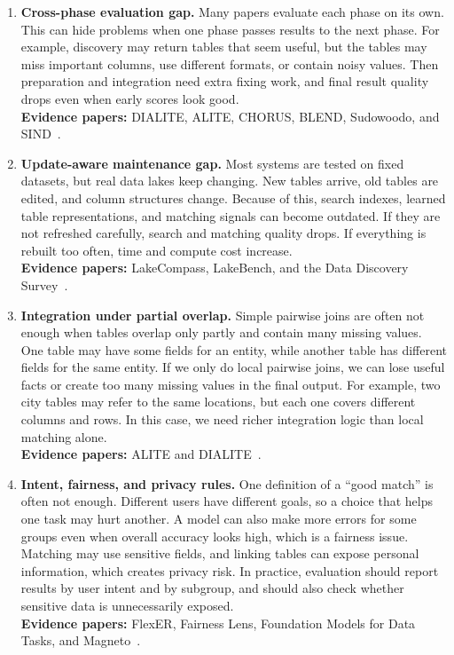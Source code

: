 \documentclass[sigconf]{acmart}
\begin{document}
\begin{enumerate}[leftmargin=*,itemsep=1pt,topsep=0pt,partopsep=0pt,parsep=0pt]
  \item \textbf{Cross-phase evaluation gap.} Many papers evaluate each phase on its own. This can hide problems when one phase passes results to the next phase. For example, discovery may return tables that seem useful, but the tables may miss important columns, use different formats, or contain noisy values. Then preparation and integration need extra fixing work, and final result quality drops even when early scores look good.\\
  \textbf{Evidence papers:} DIALITE, ALITE, CHORUS, BLEND, Sudowoodo, and SIND~\cite{10.1145/3555041.3589732,10.14778/3574245.3574274,10.14778/3659437.3659461,11112882,10184556,10.1145/3588929}.

  \item \textbf{Update-aware maintenance gap.} Most systems are tested on fixed datasets, but real data lakes keep changing. New tables arrive, old tables are edited, and column structures change. Because of this, search indexes, learned table representations, and matching signals can become outdated. If they are not refreshed carefully, search and matching quality drops. If everything is rebuilt too often, time and compute cost increase.\\
  \textbf{Evidence papers:} LakeCompass, LakeBench, and the Data Discovery Survey~\cite{10.14778/3685800.3685880,10.14778/3659437.3659448,10.14778/3750601.3750694}.

  \item \textbf{Integration under partial overlap.} Simple pairwise joins are often not enough when tables overlap only partly and contain many missing values. One table may have some fields for an entity, while another table has different fields for the same entity. If we only do local pairwise joins, we can lose useful facts or create too many missing values in the final output. For example, two city tables may refer to the same locations, but each one covers different columns and rows. In this case, we need richer integration logic than local matching alone.\\
  \textbf{Evidence papers:} ALITE and DIALITE~\cite{10.14778/3574245.3574274,10.1145/3555041.3589732}.

  \item \textbf{Intent, fairness, and privacy rules.} One definition of a ``good match'' is often not enough. Different users have different goals, so a choice that helps one task may hurt another. A model can also make more errors for some groups even when overall accuracy looks high, which is a fairness issue. Matching may use sensitive fields, and linking tables can expose personal information, which creates privacy risk. In practice, evaluation should report results by user intent and by subgroup, and should also check whether sensitive data is unnecessarily exposed.\\
  \textbf{Evidence papers:} FlexER, Fairness Lens, Foundation Models for Data Tasks, and Magneto~\cite{10.1145/3588722,10.14778/3611479.3611525,10.14778/3574245.3574258,10.14778/3742728.3742757}.
\end{enumerate}
\end{document}
